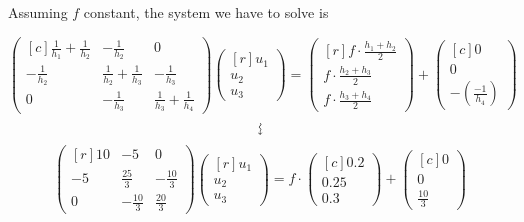 \begin{example}
Assuming $f$ constant, the system we have to solve is

\begin{equation}\label{eq:sys5.2}
  \begin{pmatrix*}[c]
    \frac{1}{h_1} + \frac{1}{h_2} & -\frac{1}{h_2}                 & 0                             \\[0.25cm]
    -\frac{1}{h_2}                & \frac{1}{h_2} + \frac{1}{h_3}  & -\frac{1}{h_3}                \\[0.25cm]
    0                             & -\frac{1}{h_3}                 & \frac{1}{h_3} + \frac{1}{h_4}
  \end{pmatrix*}
  \begin{pmatrix*}[r]
    u_1\\[0.25cm] u_2 \\[0.25cm] u_3
  \end{pmatrix*} =
  \begin{pmatrix*}[r]
    f\cdot \frac{h_1 + h_2}{2}\\[0.2cm] f\cdot \frac{h_2 + h_3}{2}\\[0.2cm] f\cdot \frac{h_3 + h_4}{2}
  \end{pmatrix*} + 
  \begin{pmatrix*}[c]
    0\\0\\ -\left(\frac{-1}{h_4}\right)
  \end{pmatrix*}
\end{equation}
$$\text{\rotatebox{270}{$\leadsto$}}$$
\[
  \begin{pmatrix*}[r]
    10 & -5            & 0\\[0.2cm]
    -5 & \frac{25}{3}  & -\frac{10}{3}\\[0.2cm]
    0  & -\frac{10}{3} & \frac{20}{3}
  \end{pmatrix*}
  \begin{pmatrix*}[r]
    u_1\\[0.2cm] u_2 \\[0.2cm] u_3
  \end{pmatrix*} =
  f\cdot\begin{pmatrix*}[c]
    0.2\\0.25\\0.3
  \end{pmatrix*} + 
  \begin{pmatrix*}[c]
    0\\0\\ \frac{10}{3}
  \end{pmatrix*}
\]
  


\end{example}
